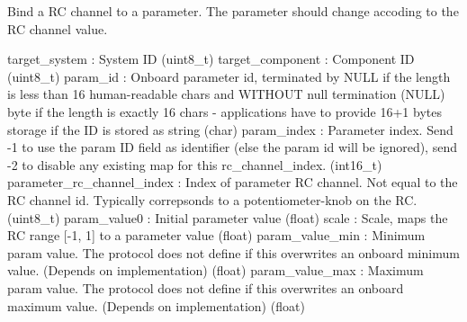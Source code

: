 \begin{DoxyVerb}
\begin{DoxyVerb}
\begin{DoxyVerb}
\begin{DoxyVerb}
\begin{DoxyVerb}Bind a RC channel to a parameter. The parameter should change accoding
to the RC channel value.

target_system             : System ID (uint8_t)
target_component          : Component ID (uint8_t)
param_id                  : Onboard parameter id, terminated by NULL if the length is less than 16 human-readable chars and WITHOUT null termination (NULL) byte if the length is exactly 16 chars - applications have to provide 16+1 bytes storage if the ID is stored as string (char)
param_index               : Parameter index. Send -1 to use the param ID field as identifier (else the param id will be ignored), send -2 to disable any existing map for this rc_channel_index. (int16_t)
parameter_rc_channel_index        : Index of parameter RC channel. Not equal to the RC channel id. Typically correpsonds to a potentiometer-knob on the RC. (uint8_t)
param_value0              : Initial parameter value (float)
scale                     : Scale, maps the RC range [-1, 1] to a parameter value (float)
param_value_min           : Minimum param value. The protocol does not define if this overwrites an onboard minimum value. (Depends on implementation) (float)
param_value_max           : Maximum param value. The protocol does not define if this overwrites an onboard maximum value. (Depends on implementation) (float)\end{DoxyVerb}
 \mbox{\label{classpymavlink_1_1dialects_1_1v10_1_1MAVLink_acfbb09f44567ac1abfc65b2ce0761c3b}} 

\end{DoxyVerb}
\end{DoxyVerb}
\end{DoxyVerb}
\end{DoxyVerb}
